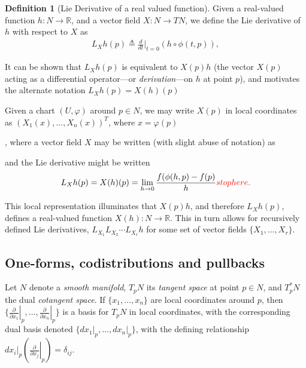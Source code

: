 \documentclass[psamsfonts]{amsart}
\theoremstyle{definition}
\newtheorem{defn}[thm]{Definition}
\theoremstyle{remark}
\newcommand*\R{\mathds{R}}
\numberwithin{equation}{section}
\begin{document}
\begin{defn}[Lie Derivative of a real valued function]
Given a real-valued function $h: N \rightarrow \R$, and a vector field $X: N\rightarrow TN$, we define the Lie derivative of $h$ with respect to $X$ as
\begin{align}
L_Xh(p) \triangleq \frac{d}{dt}\biggr|_{t=0}\left( h \circ \phi(t, p)  \right), 
\end{align}
\end{defn}
It can be shown that $L_Xh(p)$ is equivalent to $X(p)h$ (the vector $X(p)$ acting as a differential operator---or \textit{derivation}---on $h$ at point $p$), and motivates the alternate notation $L_Xh(p) = X(h)(p)$

Given a chart $(U, \varphi)$ around $p\in N$, we may write $X(p)$ in local coordinates as $(X_1(x), \dots, X_n(x))^T$, where $x = \varphi(p)$



, where a vector field $X$ may be written (with slight abuse of notation) as

 and the Lie derivative might be written 
\begin{align}
L_Xh(p) = X(h)(p) = \lim_{h\rightarrow 0}\frac{f(\phi(h, p)-f(p)}{h}{\color{red} stop here. }
\end{align}

This local representation illuminates that $X(p)h$, and therefore $L_Xh(p)$, defines a real-valued function $X(h):N\rightarrow \R$. This in turn allows for recursively defined Lie derivatives, $L_{X_{1}}L_{X_{2}}\cdots L_{X_{r}}h$ for some set of vector fields $\{X_1, \dots , X_r\}$.


\subsection{One-forms, codistributions and pullbacks}
Let $N$ denote a \textit{smooth manifold}, $T_pN $ its \textit{tangent space} at point $p \in N$, and $T^*_pN$ the dual \textit{cotangent space}. If $\{x_1, \dots, x_n\}$ are local coordinates around $p$, then
 $\{\left.\frac{\partial}{\partial x_1}\right\rvert_p,\dots, \left.\frac{\partial}{\partial x_n}\right\rvert_p \}$ is a basis for $T_pN$ in local coordinates, with the corresponding dual basis denoted $\{dx_1\vert_p, \dots, dx_n\vert_p\}$, with the defining relationship $dx_i\vert_p \left(\left.\frac{\partial}{\partial x_j}\right\rvert_p\right) = \delta_{ij}$. 
 
\end{document}
